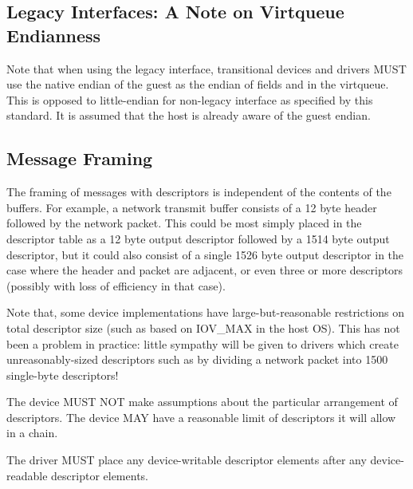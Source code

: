 \subsection{Legacy Interfaces: A Note on Virtqueue Endianness}\label{sec:Basic Facilities of a Virtio Device / Virtqueues / Legacy Interfaces: A Note on Virtqueue Endianness}

Note that when using the legacy interface, transitional
devices and drivers MUST use the native
endian of the guest as the endian of fields and in the virtqueue.
This is opposed to little-endian for non-legacy interface as
specified by this standard.
It is assumed that the host is already aware of the guest endian.

\subsection{Message Framing}\label{sec:Basic Facilities of a Virtio Device / Virtqueues / Message Framing}
The framing of messages with descriptors is
independent of the contents of the buffers. For example, a network
transmit buffer consists of a 12 byte header followed by the network
packet. This could be most simply placed in the descriptor table as a
12 byte output descriptor followed by a 1514 byte output descriptor,
but it could also consist of a single 1526 byte output descriptor in
the case where the header and packet are adjacent, or even three or
more descriptors (possibly with loss of efficiency in that case).

Note that, some device implementations have large-but-reasonable
restrictions on total descriptor size (such as based on IOV_MAX in the
host OS). This has not been a problem in practice: little sympathy
will be given to drivers which create unreasonably-sized descriptors
such as by dividing a network packet into 1500 single-byte
descriptors!

The device MUST NOT make assumptions about the particular arrangement
of descriptors.  The device MAY have a reasonable limit of descriptors
it will allow in a chain.

The driver MUST place any device-writable descriptor elements after
any device-readable descriptor elements.

